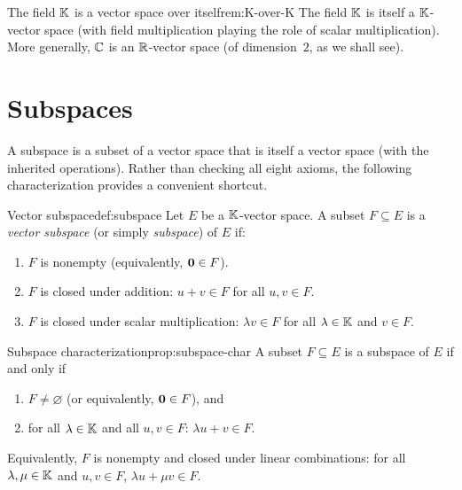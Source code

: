 \begin{remark}{The field ${\mathbb{K}}$ is a vector space over itself}{rem:K-over-K}
The field ${\mathbb{K}}$ is itself a ${\mathbb{K}}$-vector space (with field multiplication
playing the role of scalar multiplication). More generally, ${\mathbb{C}}$ is an
${\mathbb{R}}$-vector space (of dimension~$2$, as we shall see).
\end{remark}


\section{Subspaces}\label{sec:subspaces}

A subspace is a subset of a vector space that is itself a vector space
(with the inherited operations). Rather than checking all eight axioms,
the following characterization provides a convenient shortcut.

\begin{definition}{Vector subspace}{def:subspace}
Let $E$ be a ${\mathbb{K}}$-vector space. A subset $F\subseteq E$ is a
\emph{vector subspace} (or simply \emph{subspace}) of $E$ if:
\begin{enumerate}[label=(\roman*)]
  \item $F$ is nonempty (equivalently, $\mathbf{0}\in F$).
  \item $F$ is closed under addition: $u+v\in F$ for all $u,v\in F$.
  \item $F$ is closed under scalar multiplication: $\lambda v\in F$ for
    all $\lambda\in{\mathbb{K}}$ and $v\in F$.
\end{enumerate}
\end{definition}

\begin{proposition}{Subspace characterization}{prop:subspace-char}
A subset $F\subseteq E$ is a subspace of $E$ if and only if
\begin{enumerate}[label=(\alph*)]
  \item $F\neq\varnothing$ (or equivalently, $\mathbf{0}\in F$), and
  \item for all $\lambda\in{\mathbb{K}}$ and all $u,v\in F$:
    $\lambda u + v\in F$.
\end{enumerate}
Equivalently, $F$ is nonempty and closed under linear combinations: for
all $\lambda,\mu\in{\mathbb{K}}$ and $u,v\in F$, $\lambda u + \mu v\in F$.
\end{proposition}


